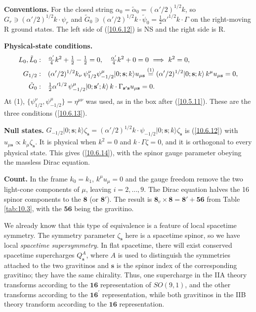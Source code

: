 	\begin{tcolorbox}[breakable]
		\begin{remark}
			\textbf{Conventions.} For the closed string $\alpha_0=\tilde\alpha_0=(\alpha'/2)^{1/2}k$, so $G_r\ni(\alpha'/2)^{1/2}k\cdot\psi_r$ and $\tilde G_0\ni(\alpha'/2)^{1/2}k\cdot\tilde\psi_0=\tfrac12\alpha'^{1/2}k\cdot\Gamma$ on the right-moving R ground states. The left side of (\ref{10.6.12}) is NS and the right side is R.

			\textbf{Physical-state conditions.}
			\begin{align*}
				L_0,\tilde L_0:&\quad \tfrac{\alpha'}{4}k^{2}+\tfrac12-\tfrac12=0,\quad \tfrac{\alpha'}{4}k^{2}+0=0\ \Longrightarrow\ k^{2}=0,\\
				G_{1/2}:&\quad (\alpha'/2)^{1/2}k_\nu\,\psi^\nu_{1/2}\psi^\mu_{-1/2}\lvert0;\mathbf s;k\rangle u_{\mu\mathbf s}\overset{(1)}{=}(\alpha'/2)^{1/2}\lvert0;\mathbf s;k\rangle\,k^\mu u_{\mu\mathbf s}=0,\\
				\tilde G_0:&\quad \tfrac12\alpha'^{1/2}\,\psi^\mu_{-1/2}\lvert0;\mathbf s';k\rangle\,k\cdot\Gamma_{\mathbf s'\mathbf s}u_{\mu\mathbf s}=0 .
			\end{align*}
			At (1), $\{\psi_{1/2}^\nu,\psi_{-1/2}^\mu\}=\eta^{\mu\nu}$ was used, as in the box after (\ref{10.5.11}). These are the three conditions (\ref{10.6.13}).

			\textbf{Null states.} $G_{-1/2}\lvert0;\mathbf s;k\rangle\zeta_{\mathbf s}=(\alpha'/2)^{1/2}k\cdot\psi_{-1/2}\lvert0;\mathbf s;k\rangle\zeta_{\mathbf s}$ is (\ref{10.6.12}) with $u_{\mu\mathbf s}\propto k_\mu\zeta_{\mathbf s}$. It is physical when $k^{2}=0$ and $k\cdot\Gamma\zeta=0$, and it is orthogonal to every physical state. This gives (\ref{10.6.14}), with the spinor gauge parameter obeying the massless Dirac equation.

			\textbf{Count.} In the frame $k_0=k_1$, $k^\mu u_\mu=0$ and the gauge freedom remove the two light-cone components of $\mu$, leaving $i=2,\dots,9$. The Dirac equation halves the 16 spinor components to the $\mathbf8$ (or $\mathbf8'$). The result is $\mathbf8_v\times\mathbf8=\mathbf8'+\mathbf{56}$ from Table \ref{tab:10.3}, with the $\mathbf{56}$ being the gravitino.
		\end{remark}
	\end{tcolorbox}
	We already know that this type of equivalence is a feature of local spacetime symmetry. The symmetry parameter $\zeta_{\mathbf{s}}$ here is a spacetime spinor, so we have local \emph{spacetime supersymmetry}. In flat spacetime, there will exist conserved spacetime supercharges $Q_{\mathbf{s}}^{A}$, where $A$ is used to distinguish the symmetries attached to the two gravitinos and $\mathbf{s}$ is the spinor index of the corresponding gravitino; they have the same chirality. Thus, one supercharge in the IIA theory transforms according to the $\mathbf{16}$ representation of $SO(9,1)$, and the other transforms according to the $\mathbf{16}^{\prime}$ representation, while both gravitinos in the IIB theory transform according to the $\mathbf{16}$ representation.
	
